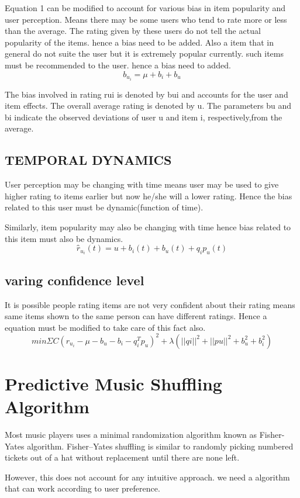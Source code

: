 Equation 1 can be modified to account for various bias in item popularity and user perception. Means there may be some users who tend to rate more or less than the average. The rating given by these users do not tell the actual popularity of the items. hence a bias need to be added. Also a item that in general do not suite the user but it is extremely popular currently. such items must be recommended to the user. hence a bias need to added.
\[b_u_i = \mu + b_i + b_u\]

The bias involved in rating rui is denoted by bui and accounts for the user and item effects. The overall average rating is denoted by u. The parameters bu and bi indicate the observed deviations of user u and item i, respectively,from the average.

\subsection{TEMPORAL DYNAMICS}
User perception may be changing with time means user may be used to give higher rating to items earlier but now he/she will a lower rating. Hence the bias related to this user must be dynamic(function of time).

Similarly, item popularity may also be changing with time hence bias related to this item must also be dynamics.
\[r̂ _u_i (t) = u + b_i (t) + b_u (t) + q_i p_u (t)\]


\subsection{varing confidence level}
It is possible people rating items are not very confident about their rating means same items shown to the same person can have different ratings. Hence a equation must be modified to take care of this fact also.
\[min \Sigma C (r_u_i - \mu - b_u - b_i - q_i^T p_u )^2 + λ(|| q i ||^2 + || p u ||^2
+ b_u^2 + b_i^2 )\]

\section{Predictive Music Shuffling Algorithm\cite{predictiveShuffling}}
Most music players uses a minimal randomization algorithm known as Fisher-Yates algorithm.
Fisher–Yates shuffling is similar to randomly picking numbered tickets out of a hat without replacement until there are none left.

However, this does not account for any
intuitive approach. we need a algorithm that can work according to user preference.

